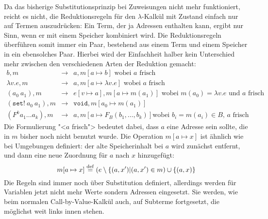 Da das bisherige Substitutionsprinzip bei Zuweisungen nicht mehr funktioniert, reicht es
nicht, die Reduktionsregeln für den $\lambda$-Kalkül mit Zustand
einfach nur auf Termen auszudrücken: Ein Term, der ja Adressen
enthalten kann, ergibt nur Sinn, wenn er mit einem Speicher kombiniert
wird.  Die Reduktionsregeln überführen somit immer ein Paar, bestehend aus
einem Term und einem Speicher in ein ebensolches Paar.  Hierbei wird der
Einfachheit halber kein Unterschied mehr zwischen den verschiedenen
Arten der Reduktion gemacht:
%
\begin{eqnarray*}
  b, m &\rightarrow& a, m[a\mapsto b] \textrm{ wobei $a$ frisch}
  \\
  \lambda v.e, m &\rightarrow&
  a, m[a\mapsto \lambda v.e]  \textrm{ wobei $a$ frisch}
  \\
  (a_0~a_1), m &\rightarrow& e[v\mapsto a], m[a\mapsto m(a_1)]
  \textrm{ wobei $m(a_0) = \lambda v.e$ und $a$ frisch} 
  \\
  (\mathtt{set!}~a_0~a_1), m &\rightarrow& \mathtt{void}, m[a_0\mapsto m(a_1)]
  \\
  (F^k a_1 \ldots a_k), m &\rightarrow& a, m[a\mapsto F_B(b_1, \ldots, b_k)] \textrm{
    wobei $b_i = m(a_i) \in B$, $a$ frisch}
\end{eqnarray*}
%
Die Formulierung "<$a$ frisch"> bedeutet dabei, dass $a$ eine Adresse
sein sollte, die in $m$ bisher noch nicht benutzt wurde.  Die Operation
$m[a\mapsto x]$ ist ähnlich wie bei Umgebungen definiert: der alte
Speicherinhalt bei $a$ wird zunächst entfernt, und dann eine neue
Zuordnung für $a$ nach $x$ hinzugefügt:
%
\begin{displaymath}
  m[a\mapsto x] \stackrel{\rm def}{=} (e \setminus \{ (a, x') | (a, x') \in m) \cup \{
    (a, x) \}
\end{displaymath}
%
Die Regeln sind immer noch über Substitution definiert, allerdings
werden für Variablen jetzt nicht mehr Werte sondern Adressen
eingesetzt.  Sie werden, wie beim normalen Call-by-Value-Kalkül auch,
auf Subterme fortgesetzt, die möglichst weit links innen stehen.

